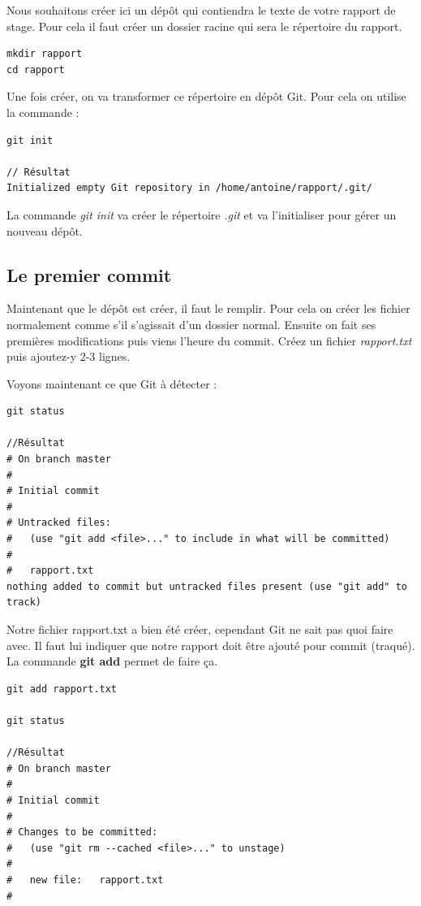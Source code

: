 \documentclass[a4paper]{article}
\begin{document}
Nous souhaitons créer ici un dépôt qui contiendra le texte de votre rapport de stage. Pour cela il faut créer un dossier racine qui sera le répertoire du rapport.

\begin{verbatim}
mkdir rapport
cd rapport
\end{verbatim}

Une fois créer, on va transformer ce répertoire en dépôt Git. Pour cela on utilise la commande :

\begin{verbatim}
git init

// Résultat
Initialized empty Git repository in /home/antoine/rapport/.git/
\end{verbatim}

La commande \emph{git init} va créer le répertoire \emph{.git} et va l'initialiser pour gérer un nouveau dépôt.

\subsection{Le premier commit}

Maintenant que le dépôt est créer, il faut le remplir. Pour cela on créer les fichier normalement comme s'il s'agissait d'un dossier normal. Ensuite on fait ses premières modifications puis viens l'heure du commit. Créez un fichier \emph{rapport.txt} puis ajoutez-y 2-3 lignes.

Voyons maintenant ce que Git à détecter :

\begin{verbatim}
git status

//Résultat
# On branch master
#
# Initial commit
#
# Untracked files:
#   (use "git add <file>..." to include in what will be committed)
#
#	rapport.txt
nothing added to commit but untracked files present (use "git add" to track)
\end{verbatim}

Notre fichier rapport.txt a bien été créer, cependant Git ne sait pas quoi faire avec. Il faut lui indiquer que notre rapport doit être ajouté pour commit (traqué). La commande \textbf{git add} permet de faire ça.

\begin{verbatim}
git add rapport.txt

git status

//Résultat
# On branch master
#
# Initial commit
#
# Changes to be committed:
#   (use "git rm --cached <file>..." to unstage)
#
#	new file:   rapport.txt
#
\end{verbatim}
\end{document}
